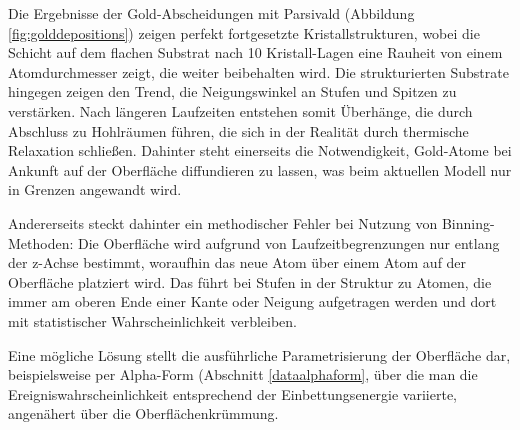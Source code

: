 Die Ergebnisse der Gold-Abscheidungen mit Parsivald (Abbildung \ref{fig:golddepositions}) zeigen perfekt fortgesetzte Kristallstrukturen, wobei die Schicht auf dem flachen Substrat nach 10 Kristall-Lagen eine Rauheit von einem Atomdurchmesser zeigt, die weiter beibehalten wird.
Die strukturierten Substrate hingegen zeigen den Trend, die Neigungswinkel an Stufen und Spitzen zu verstärken.
Nach längeren Laufzeiten entstehen somit Überhänge, die durch Abschluss zu Hohlräumen führen, die sich in der Realität durch thermische Relaxation schließen.
Dahinter steht einerseits die Notwendigkeit, Gold-Atome bei Ankunft auf der Oberfläche diffundieren zu lassen, was beim aktuellen Modell nur in Grenzen angewandt wird.

Andererseits steckt dahinter ein methodischer Fehler bei Nutzung von Binning-Methoden:
Die Oberfläche wird aufgrund von Laufzeitbegrenzungen nur entlang der z-Achse bestimmt, woraufhin das neue Atom über einem Atom auf der Oberfläche platziert wird.
Das führt bei Stufen in der Struktur zu Atomen, die immer am oberen Ende einer Kante oder Neigung aufgetragen werden und dort mit statistischer Wahrscheinlichkeit verbleiben.

Eine mögliche Lösung stellt die ausführliche Parametrisierung der Oberfläche dar, beispielsweise per Alpha-Form (Abschnitt \ref{dataalphaform}, über die man die Ereigniswahrscheinlichkeit entsprechend der Einbettungsenergie variierte, angenähert über die Oberflächenkrümmung.
